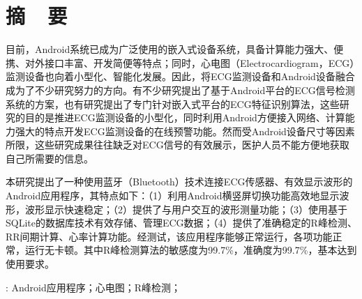 \section*{\xiaoerhao \heiti 摘~~要}
\xiaosihao
目前，Android系统已成为广泛使用的嵌入式设备系统，具备计算能力强大、便携、对外接口丰富、开发简便等特点；同时，心电图（Electrocardiogram，ECG）监测设备也向着小型化、智能化发展。因此，将ECG监测设备和Android设备融合成为了不少研究努力的方向。有不少研究提出了基于Android平台的ECG信号检测系统的方案，也有研究提出了专门针对嵌入式平台的ECG特征识别算法，这些研究的目的是推进ECG监测设备的小型化，同时利用Android方便接入网络、计算能力强大的特点开发ECG监测设备的在线预警功能。然而受Android设备尺寸等因素所限，这些研究成果往往缺乏对ECG信号的有效展示，医护人员不能方便地获取自己所需要的信息。

本研究提出了一种使用蓝牙（Bluetooth）技术连接ECG传感器、有效显示波形的Android应用程序，其特点如下：（1）利用Android横竖屏切换功能高效地显示波形，波形显示快速稳定；（2）提供了与用户交互的波形测量功能；（3）使用基于SQLite的数据库技术有效存储、管理ECG数据；（4）提供了准确稳定的R峰检测、RR间期计算、心率计算功能。经测试，该应用程序能够正常运行，各项功能正常，运行无卡顿。其中R峰检测算法的敏感度为99.7\%，准确度为99.7\%，基本达到使用要求。


\noindent
{}:
\song
Android应用程序；心电图；R峰检测；
\indent

